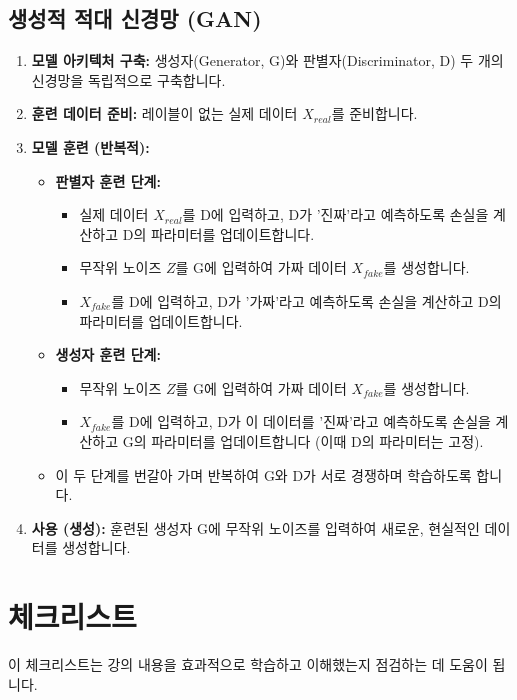 \documentclass[11pt,a4paper]{article}
\theoremstyle{definition}
\begin{document}
\subsection{생성적 적대 신경망 (GAN)}
\begin{enumerate}
    \item \textbf{모델 아키텍처 구축:} 생성자(Generator, G)와 판별자(Discriminator, D) 두 개의 신경망을 독립적으로 구축합니다.
    \item \textbf{훈련 데이터 준비:} 레이블이 없는 실제 데이터 $X_{real}$를 준비합니다.
    \item \textbf{모델 훈련 (반복적):}
    \begin{itemize}
        \item \textbf{판별자 훈련 단계:}
        \begin{itemize}
            \item 실제 데이터 $X_{real}$를 D에 입력하고, D가 '진짜'라고 예측하도록 손실을 계산하고 D의 파라미터를 업데이트합니다.
            \item 무작위 노이즈 $Z$를 G에 입력하여 가짜 데이터 $X_{fake}$를 생성합니다.
            \item $X_{fake}$를 D에 입력하고, D가 '가짜'라고 예측하도록 손실을 계산하고 D의 파라미터를 업데이트합니다.
        \end{itemize}
        \item \textbf{생성자 훈련 단계:}
        \begin{itemize}
            \item 무작위 노이즈 $Z$를 G에 입력하여 가짜 데이터 $X_{fake}$를 생성합니다.
            \item $X_{fake}$를 D에 입력하고, D가 이 데이터를 '진짜'라고 예측하도록 손실을 계산하고 G의 파라미터를 업데이트합니다 (이때 D의 파라미터는 고정).
        \end{itemize}
        \item 이 두 단계를 번갈아 가며 반복하여 G와 D가 서로 경쟁하며 학습하도록 합니다.
    \end{itemize}
    \item \textbf{사용 (생성):} 훈련된 생성자 G에 무작위 노이즈를 입력하여 새로운, 현실적인 데이터를 생성합니다.
\end{enumerate}

\newpage
\section{체크리스트}

이 체크리스트는 강의 내용을 효과적으로 학습하고 이해했는지 점검하는 데 도움이 됩니다.
\end{document}
